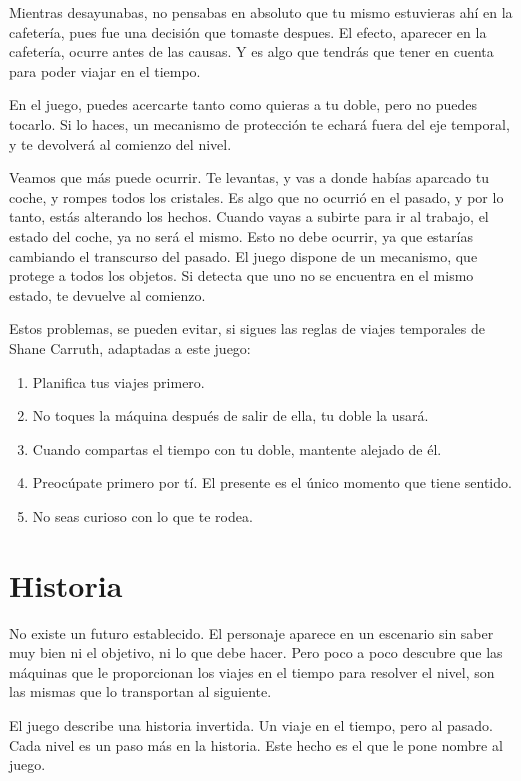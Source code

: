 \documentclass[11pt,a4paper]{article}
\begin{document}
Mientras desayunabas, no pensabas en absoluto que tu mismo estuvieras ahí en la 
cafetería, pues fue una decisión que tomaste despues. El efecto, aparecer en la 
cafetería, ocurre antes de las causas. Y es algo que tendrás que tener en cuenta 
para poder viajar en el tiempo.

En el juego, puedes acercarte tanto como quieras a tu doble, pero no puedes 
tocarlo. Si lo haces, un mecanismo de protección te echará fuera del eje 
temporal, y te devolverá al comienzo del nivel.

Veamos que más puede ocurrir. Te levantas, y vas a donde habías aparcado tu 
coche, y rompes todos los cristales. Es algo que no ocurrió en el pasado, y por 
lo tanto, estás alterando los hechos. Cuando vayas a subirte para ir al trabajo, 
el estado del coche, ya no será el mismo. Esto no debe ocurrir, ya que estarías 
cambiando el transcurso del pasado. El juego dispone de un mecanismo, que 
protege a todos los objetos. Si detecta que uno no se encuentra en el mismo 
estado, te devuelve al comienzo.

Estos problemas, se pueden evitar, si sigues las reglas de viajes temporales de 
Shane Carruth, adaptadas a este juego:
\begin{enumerate}
\item Planifica tus viajes primero.
\item No toques la máquina después de salir de ella, tu doble la usará.
\item Cuando compartas el tiempo con tu doble, mantente alejado de él.
\item Preocúpate primero por tí. El presente es el único momento que tiene 
sentido.
\item No seas curioso con lo que te rodea.
\end{enumerate}

\section{Historia}

No existe un futuro establecido. El personaje aparece en un escenario sin saber 
muy bien ni el objetivo, ni lo que debe hacer. Pero poco a poco descubre que las 
máquinas que le proporcionan los viajes en el tiempo para resolver el nivel, son 
las mismas que lo transportan al siguiente.

El juego describe una historia invertida. Un viaje en el tiempo, pero al pasado.  
Cada nivel es un paso más en la historia. Este hecho es el que le pone nombre al 
juego.
\end{document}
